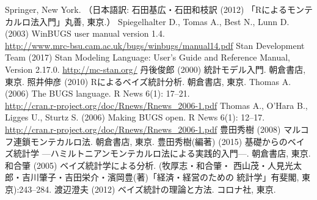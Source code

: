 \documentclass[11pt,uplatex]{jsarticle}
\begin{document}
\begin{thebibliography}{99}
  Springer, New York.
  （日本語訳: 石田基広・石田和枝訳 (2012) 「Rによるモンテカルロ法入門」丸善, 東京.）
 Spiegelhalter D., Tomas A., Best N., Lunn D. (2003)
  WinBUGS user manual version 1.4.\\
  \url{http://www.mrc-bsu.cam.ac.uk/bugs/winbugs/manual14.pdf}
 Stan Development Team (2017) Stan Modeling Language:
  User's Guide and Reference Manual, Version 2.17.0.
  \url{http://mc-stan.org/}
 丹後俊郎 (2000) 統計モデル入門. 朝倉書店, 東京.
 照井伸彦 (2010) Rによるベイズ統計分析. 朝倉書店, 東京.
 Thomas A. (2006) The BUGS language.
  R News 6(1): 17--21. \\
  \url{http://cran.r-project.org/doc/Rnews/Rnews_2006-1.pdf}
 Thomas A., O'Hara B., Ligges U., Sturtz S. (2006) Making BUGS open.
  R News 6(1): 12--17. \\
  \url{http://cran.r-project.org/doc/Rnews/Rnews_2006-1.pdf}
 豊田秀樹 (2008) マルコフ連鎖モンテカルロ法. 朝倉書店, 東京.
 豊田秀樹(編著) (2015) 基礎からのベイズ統計学
  ---ハミルトニアンモンテカルロ法による実践的入門---. 朝倉書店, 東京.
 和合肇 (2005) ベイズ統計学による分析. (牧厚志・和合肇・
  西山茂・人見光太郎・吉川肇子・吉田栄介・濱岡豊(著)「経済・経営のための
  統計学」有斐閣, 東京):243--284.
 渡辺澄夫 (2012) ベイズ統計の理論と方法. コロナ社, 東京.
\end{thebibliography}
\end{document}
